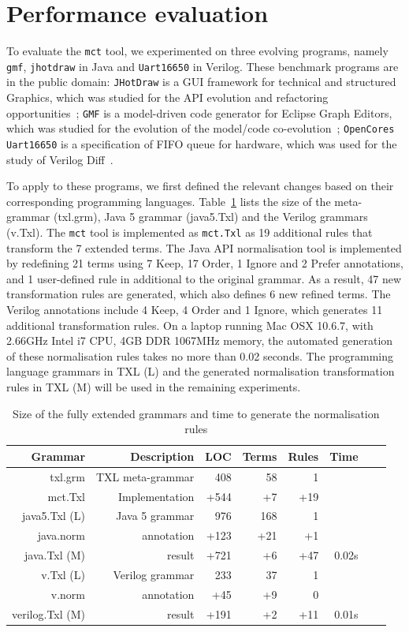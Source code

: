 \documentclass[10pt, conference, compsocconf]{IEEEtran}
\begin{document}
{\section{Performance evaluation}\label{sec:experiment}
To evaluate the {\tt mct} tool, we experimented on three evolving programs, namely {\tt gmf}, {\tt jhotdraw} in Java and {\tt Uart16650} in Verilog. These benchmark programs are in the public domain: {\tt JHotDraw} is a  GUI framework for technical and structured Graphics, which was studied for the API evolution and refactoring opportunities~\cite{DBLP:journals/smr/DigJ06}; {\tt GMF} is a model-driven code generator for Eclipse Graph Editors, which was  studied for the evolution of the model/code co-evolution~\cite{DBLP:conf/sle/HerrmannsdoerferRW09}; {\tt OpenCores Uart16650} is a specification of FIFO queue for hardware, which was used for the study of Verilog Diff~\cite{Duley:2010:PDA:1858996.1859093}.

To apply to these programs, we first defined the relevant changes based on their corresponding programming languages. Table~\ref{table:2} lists the size of the meta-grammar (txl.grm), Java 5 grammar (java5.Txl) and the Verilog grammars (v.Txl). The {\tt mct} tool is implemented as {\tt mct.Txl} as 19 additional rules that transform the 7 extended terms. The Java API normalisation tool is implemented by redefining 21 terms using 7 Keep, 17 Order, 1 Ignore and 2 Prefer annotations, and 1 user-defined rule in additional to the original grammar. As a result, 47 new transformation rules are generated, which also defines 6 new refined terms. The Verilog annotations include 4 Keep, 4 Order and 1 Ignore, which generates 11 additional transformation rules. On a laptop running Mac OSX 10.6.7, with 2.66GHz Intel i7 CPU, 4GB DDR 1067MHz memory, the automated generation of these normalisation rules takes no more than 0.02 seconds. The programming language grammars in TXL (L) and the generated normalisation transformation rules in TXL (M) will be used in the remaining experiments.
\begin{table}\centering
\caption{Size of the fully extended grammars and time to generate the normalisation rules\label{table:2}}
\begin{tabular}{| r || r | r | r | r |  r |  r |  r  |}\hline
\bf Grammar & \bf Description &\bf  LOC &\bf  Terms &\bf   Rules &\bf  Time \\  \hline\hline
txl.grm & TXL meta-grammar & 408 & 58 & 1  &\\
mct.Txl & Implementation & +544 & +7 & +19 &\\ \hline
java5.Txl (L)& Java 5 grammar &  976 & 168 & 1 &\\
java.norm & annotation & +123 & +21 & +1 &\\ 
java.Txl (M)& result & +721  & +6 & +47  & 0.02s\\\hline  
v.Txl (L)& Verilog grammar & 233 &  37 &  1 &\\
v.norm & annotation & +45 & +9 & 0 &\\
verilog.Txl (M)& result & +191 &  +2 & +11 & 0.01s\\\hline
\hline\end{tabular}
\end{table}

}
\end{document}
